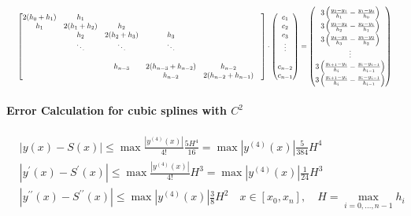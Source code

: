 \begin{equation} 
\resizebox{1\textwidth}{!}{
    $\begin{bmatrix} 
        2(h_0+h_1) & h_1 &  &  &\\ 
         h_1 & 2(h_1+h_2) & h_2 &  &\\ 
          & h_2 & 2(h_2+h_3) & h_3 & \\ 
          & \ddots & \ddots & \ddots & \\ 
          &  &  &  &  &  \\
          &  & h_{n-3} & 2(h_{n-3}+h_{n-2}) & h_{n-2} \\
          &  & & h_{n-2} & 2(h_{n-2}+h_{n-1})
    \end{bmatrix}
    \cdot 
    \begin{pmatrix} 
        c_1\\ 
        c_2\\ 
        c_3\\
        \vdots\\
        \\
        c_{n-2}\\
        c_{n-1}
    \end{pmatrix} = 
    \begin{pmatrix} 
        3\left(\frac{y_{2}-y_1}{h_{1}}-\frac{y_1-y_{0}}{h_{0}}\right)\\ 
        3\left(\frac{y_{3}-y_2}{h_2}-\frac{y_2-y_{1}}{h_{1}}\right)\\ 
        3\left(\frac{y_{4}-y_3}{h_3}-\frac{y_3-y_{2}}{h_{2}}\right)\\ 
        \vdots\\ 
        3\left(\frac{y_{i+1}-y_i}{h_i}-\frac{y_i-y_{i-1}}{h_{i-1}}\right)\\ 
        3\left(\frac{y_{i+1}-y_i}{h_i}-\frac{y_i-y_{i-1}}{h_{i-1}}\right)
    \end{pmatrix}$
}\end{equation}
\paragraph{Error Calculation for cubic splines with $C^2$}
\begin{equation}\label{eq:spline_osculation_error_periodic}
\begin{aligned}
&|y(x)-S(x)| \leq \max \frac{\left|y^{(4)}(x)\right|}{4 !} \frac{5 H^4}{16}=\max \left|y^{(4)}(x)\right| \frac{5}{384} H^4\\
&\left|y^{\prime}(x)-S^{\prime}(x)\right| \leq \max \frac{\left|y^{(4)}(x)\right|}{4 !} H^3=\max \left|y^{(4)}(x)\right| \frac{1}{24} H^3\\
&\left|y^{\prime \prime}(x)-S^{\prime \prime}(x)\right| \leq \max \left|y^{(4)}(x)\right| \frac{3}{8} H^2 \quad x \in\left[x_0, x_n\right], \quad H=\max _{i=0, \ldots, n-1} h_i
\end{aligned}
\end{equation}

